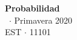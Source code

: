 \documentclass[8pt,a4paper]{extarticle}
\renewcommand{\csClass}{Probabilidad}
\renewcommand{\csClassCode}{EST $\cdot$ 11101}
\renewcommand{\csTerm}{Primavera 2020}
\begin{document}
\begin{titlepage}
    \begin{center}
        \vspace*{1cm}
        \Huge
        \textbf{\csClass}
        \vspace{0.5cm} \\
        \Large
        \cs\ $\cdot$ \csTerm
        \vfill
        \csAuthorName\\
        \vspace{0.8cm}
        \csClassCode\\
        \csSchool
    \end{center}
\end{titlepage}

\begin{multicols}{3}
    \setcounter{page}{1}

    \vfill\eject
    \columnbreak
\end{multicols}
\end{document}
